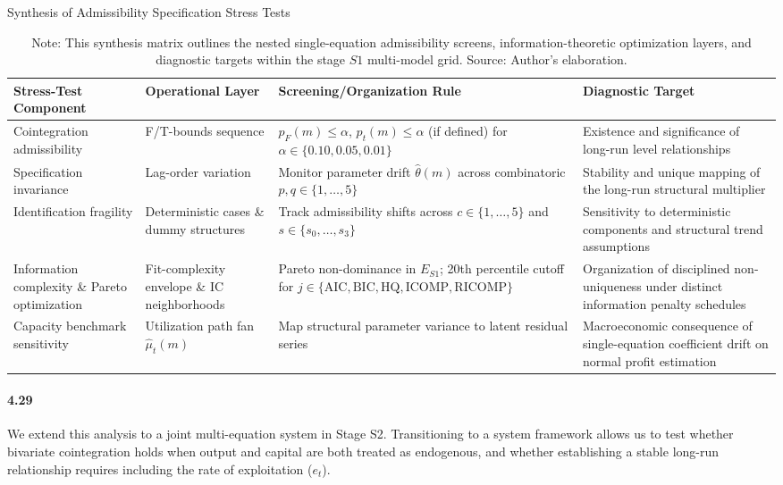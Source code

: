\begin{table}[h!]
\centering
\small
\caption{Synthesis of Admissibility Specification Stress Tests}
\label{tab:s1_stress_synthesis}
\begin{tabular}{@{}>{\raggedright\arraybackslash}p{3.2cm}>{\raggedright\arraybackslash}p{2.6cm}>{\raggedright\arraybackslash}p{3.8cm}>{\raggedright\arraybackslash}p{4.0cm}@{}}
\toprule
\toprule
Stress-Test Component & Operational Layer & Screening/Organization Rule & Diagnostic Target \\
\midrule
\midrule
Cointegration admissibility & F/T-bounds sequence & $p_F(m) \leq \alpha$, $p_t(m) \leq \alpha$ (if defined) for $\alpha \in \{0.10, 0.05, 0.01\}$ & Existence and significance of long-run level relationships \\
Specification invariance & Lag-order variation & Monitor parameter drift $\hat{\theta}(m)$ across combinatoric $p,q \in \{1,\dots,5\}$ & Stability and unique mapping of the long-run structural multiplier \\
Identification fragility & Deterministic cases \& dummy structures & Track admissibility shifts across $c \in \{1,\dots,5\}$ and $s \in \{s_0,\dots,s_3\}$ & Sensitivity to deterministic components and structural trend assumptions \\
Information complexity \& Pareto optimization & Fit-complexity envelope \& IC neighborhoods & Pareto non-dominance in $E_{S1}$; 20th percentile cutoff for $j \in \{\text{AIC}, \text{BIC}, \text{HQ}, \text{ICOMP}, \text{RICOMP}\}$ & Organization of disciplined non-uniqueness under distinct information penalty schedules \\
Capacity benchmark sensitivity & Utilization path fan $\hat{\mu}_t(m)$ & Map structural parameter variance to latent residual series & Macroeconomic consequence of single-equation coefficient drift on normal profit estimation \\
\bottomrule
\end{tabular}
\caption*{\footnotesize Note: This synthesis matrix outlines the nested single-equation admissibility screens, information-theoretic optimization layers, and diagnostic targets within the stage $S1$ multi-model grid. Source: Author's elaboration.}
\end{table}

\paragraph{4.29}
We extend this analysis to a joint multi-equation system in Stage S2. Transitioning to a system framework allows us to test whether bivariate cointegration holds when output and capital are both treated as endogenous, and whether establishing a stable long-run relationship requires including the rate of exploitation ($e_t$).

